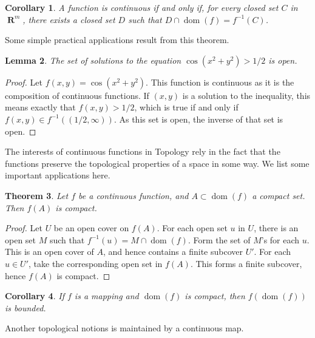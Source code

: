 \documentclass{report}
\newtheorem{theorem}{Theorem}[chapter]
\newtheorem{lemma}[theorem]{Lemma}
\newtheorem{corollary}[theorem]{Corollary}
\DeclareMathOperator{\real}{\mathbf{R}}
\DeclareMathOperator{\dom}{dom}
\begin{document}
\begin{corollary}
  A function is continuous if and only if, for every closed set $C$ in $\real^m$, there exists a closed set $D$ such that $D \cap \dom(f) = f^{-1}(C)$.
\end{corollary}

Some simple practical applications result from this theorem.

\begin{lemma}
  The set of solutions to the equation $\cos(x^2 + y^2) > 1/2$ is open.
\end{lemma}
\begin{proof}
  Let $f(x,y) = \cos(x^2 + y^2)$. This function is continuous as it is the composition of continuous functions. If $(x,y)$ is a solution to the inequality, this means exactly that $f(x,y) > 1/2$, which is true if and only if $f(x,y) \in f^{-1}((1/2, \infty))$. As this set is open, the inverse of that set is open.
\end{proof}

The interests of continuous functions in Topology rely in the fact that the functions preserve the topological properties of a space in some way. We list some important applications here.

\begin{theorem}
  Let $f$ be a continuous function, and $A \subset \dom(f)$ a compact set. Then $f(A)$ is compact.
\end{theorem}
\begin{proof}
  Let $U$ be an open cover on $f(A)$. For each open set $u$ in $U$, there is an open set $M$ such that $f^{-1}(u) = M \cap \dom(f)$. Form the set of $M$'s for each $u$. This is an open cover of $A$, and hence contains a finite subcover $U'$. For each $u \in U'$, take the corresponding open set in $f(A)$. This forms a finite subcover, hence $f(A)$ is compact.
\end{proof}

\begin{corollary}
  If $f$ is a mapping and $\dom(f)$ is compact, then $f(\dom(f))$ is bounded.
\end{corollary}

Another topological notions is maintained by a continuous map.
\end{document}
